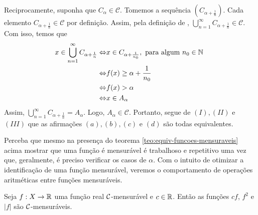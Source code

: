 \begin{prova}
Reciprocamente, suponha que $C_\alpha \in \mathcal{C}$. Tomemos a sequência $\left(C_{\alpha + \frac{1}{n}}\right)$.
Cada elemento $C_{\alpha +\frac{1}{n}} \in \mathcal{C}$ por definição.
Assim, pela definição de \sigal, 
$\displaystyle \bigcup_{n = 1}^\infty C_{\alpha +\frac{1}{n}} \in \mathcal{C}$. Com isso, temos que
\begin{align*}
    x \in \displaystyle \bigcup_{n = 1}^\infty C_{\alpha +\frac{1}{n}}
    \Leftrightarrow & x \in C_{\alpha + \frac{1}{n_0}}, \textrm{\ para algum  $n_0 \in \N$ }\\
    \Leftrightarrow & f(x)\geq \alpha +\dfrac{1}{n_0}\\
    \Leftrightarrow & f(x) > \alpha \\
    \Leftrightarrow & x \in A_\alpha
\end{align*}
Assim, $\displaystyle \bigcup_{n = 1}^\infty C_{\alpha +\frac{1}{n}} = A_\alpha$. Logo, $A_\alpha \in \mathcal{C}$.
Portanto, segue de $(I), (II)$ e $(III)$ que as afirmações $(a), (b), (c)$ e $(d)$ são todas equivalentes.


\end{prova}

Perceba que mesmo na presença do teorema \ref{teo:equiv-funcoes-mensuraveis} acima mostrar que uma função é mensurável é trabalhoso e repetitivo uma vez que, geralmente, é preciso verificar os casos de $\alpha$.
Com o intuito de otimizar a identificação de uma função mensurável, veremos o comportamento de operações aritméticas entre funções mensuráveis.

\begin{proposition}
\label{prop:aritmetica-uma-funcao}
Seja $f: X \to \mathbb{R}$ uma função real $\operatorname{\mathcal{C}}$-mensurável e $c \in \mathbb{R}$. Então as funções $cf$, $f^2$ e $|f|$ são $\operatorname{\mathcal{C}}$-mensuráveis. 
\end{proposition}

